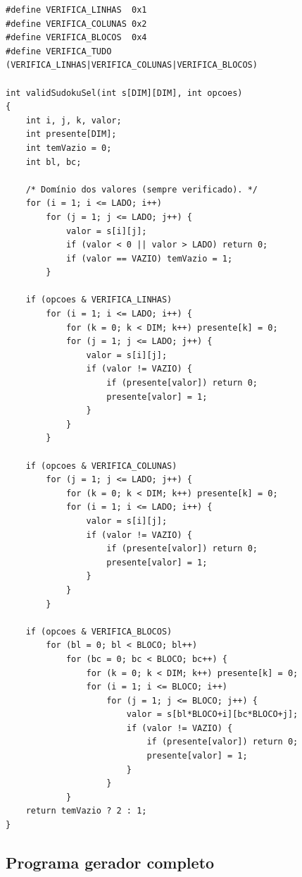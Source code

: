 \documentclass[11pt,a4paper,oneside]{report}
\begin{document}
\begin{lstlisting}[caption={\texttt{validSudoku} com flags de verificação seletiva.},label={lst:valid_flags}]
#define VERIFICA_LINHAS  0x1
#define VERIFICA_COLUNAS 0x2
#define VERIFICA_BLOCOS  0x4
#define VERIFICA_TUDO    (VERIFICA_LINHAS|VERIFICA_COLUNAS|VERIFICA_BLOCOS)

int validSudokuSel(int s[DIM][DIM], int opcoes)
{
    int i, j, k, valor;
    int presente[DIM];
    int temVazio = 0;
    int bl, bc;

    /* Domínio dos valores (sempre verificado). */
    for (i = 1; i <= LADO; i++)
        for (j = 1; j <= LADO; j++) {
            valor = s[i][j];
            if (valor < 0 || valor > LADO) return 0;
            if (valor == VAZIO) temVazio = 1;
        }

    if (opcoes & VERIFICA_LINHAS)
        for (i = 1; i <= LADO; i++) {
            for (k = 0; k < DIM; k++) presente[k] = 0;
            for (j = 1; j <= LADO; j++) {
                valor = s[i][j];
                if (valor != VAZIO) {
                    if (presente[valor]) return 0;
                    presente[valor] = 1;
                }
            }
        }

    if (opcoes & VERIFICA_COLUNAS)
        for (j = 1; j <= LADO; j++) {
            for (k = 0; k < DIM; k++) presente[k] = 0;
            for (i = 1; i <= LADO; i++) {
                valor = s[i][j];
                if (valor != VAZIO) {
                    if (presente[valor]) return 0;
                    presente[valor] = 1;
                }
            }
        }

    if (opcoes & VERIFICA_BLOCOS)
        for (bl = 0; bl < BLOCO; bl++)
            for (bc = 0; bc < BLOCO; bc++) {
                for (k = 0; k < DIM; k++) presente[k] = 0;
                for (i = 1; i <= BLOCO; i++)
                    for (j = 1; j <= BLOCO; j++) {
                        valor = s[bl*BLOCO+i][bc*BLOCO+j];
                        if (valor != VAZIO) {
                            if (presente[valor]) return 0;
                            presente[valor] = 1;
                        }
                    }
            }
    return temVazio ? 2 : 1;
}
\end{lstlisting}

\subsection{Programa gerador completo}
\end{document}
